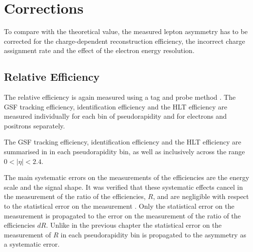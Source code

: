 \section{Corrections}

To compare with the theoretical value, the measured lepton asymmetry has to be
corrected for the charge-dependent reconstruction efficiency, the incorrect charge
assignment rate and the effect of the electron energy resolution.

\subsection{Relative Efficiency}
The relative efficiency is again measured using a tag and probe method \cite{adam2009tag}.
The {GSF} tracking efficiency,
identification efficiency and the {HLT} efficiency are measured individually
for each bin of pseudorapidity and for electrons and positrons separately. 

The {GSF} tracking efficiency, identification efficiency and the {HLT}
efficiency are summarised in 
in each pseudorapidity bin, as well as inclusively
across the range $0<| \eta |< 2.4$. 

The main systematic errors on the measurements of the efficiencies are the
energy scale and the signal shape. It was verified that these systematic effects
cancel in the measurement of the ratio of the efficiencies, $R$, and are
negligible with respect to the statistical error on the measurement
\cite{bendavid2011electron} .  Only the statistical error on the measurement is
propagated to the error on the measurement of the ratio of the efficiencies
$dR$.  Unlike in the previous chapter the statistical error on the measurement
of $R$ in each pseudorapidity bin is propagated to the asymmetry as a systematic
error. 

